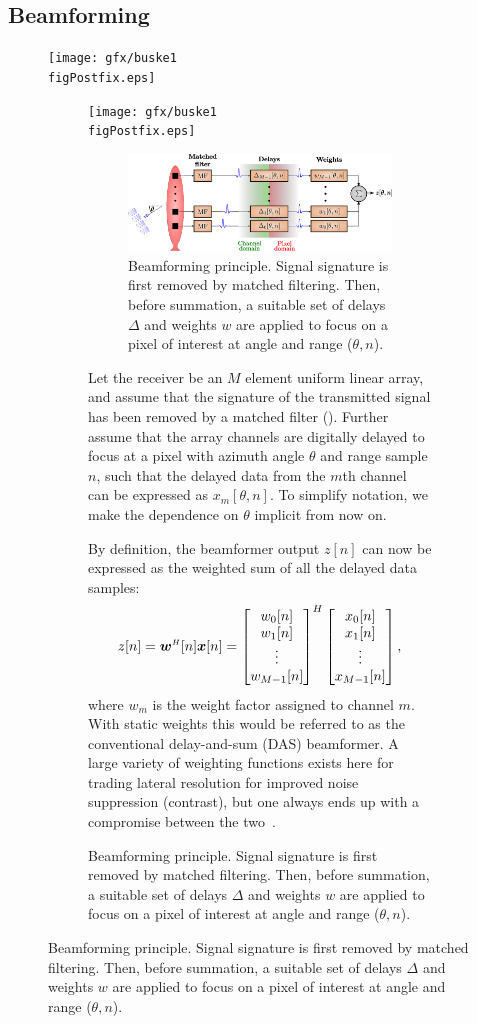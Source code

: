 \subsection{Beamforming}
\ifPhdDoc
\begin{figure}[htbp]\centering
\texttt{[image: gfx/buske1\\figPostfix.eps]}
\else
\ifPeerReview
\begin{figure}[htbp]\centering
\texttt{[image: gfx/buske1\\figPostfix.eps]}
\else
\begin{figure}[!t]\centering
\includegraphics[width=\linewidth]{gfx/beamforming.eps}
\fi\fi%
\caption{Beamforming principle. Signal signature is first removed by matched filtering. Then, before summation, a suitable set of delays $\Delta$ and weights $w$ are applied to focus on a pixel of interest at angle and range ($\theta,n$).}\label{I_beamforming}
\end{figure}
Let the receiver be an $M$ element uniform linear array, and assume that the signature of the transmitted signal has been removed by a matched filter (). Further assume that the array channels are digitally delayed to focus at a pixel with azimuth angle $\theta$ and range sample $n$, such that the delayed data from the $m$th channel can be expressed as $x_m[\theta,n]$. To simplify notation, we make the dependence on $\theta$ implicit from now on. 

By definition, the beamformer output $z[n]$ can now be expressed as the weighted sum of all the delayed data samples:
\begin{align}
z[n] = \w\H[n]\x[n] = \bmat{w_0[n]\\w_1[n]\\\vdots\\w_{M-1}[n]}^H \bmat{x_0[n]\\x_1[n]\\\vdots\\x_{M-1}[n]},\label{I_z}
\end{align}
where $w_m$ is the weight factor assigned to channel $m$. With static weights this would be referred to as the conventional delay-and-sum (DAS) beamformer. A large variety of weighting functions exists here for trading lateral resolution for improved noise suppression (contrast), but one always ends up with a compromise between the two~\cite{Harris1978}.


\end{figure}
\end{figure}
